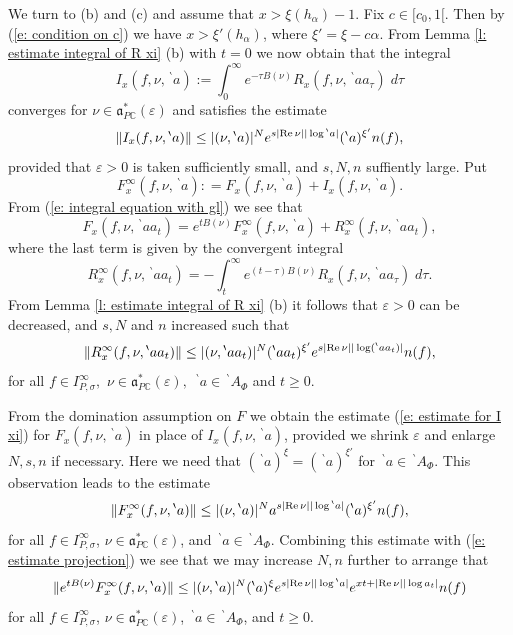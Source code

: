 \documentclass[12pt,a4paper]{article}
\def\msy#1{{\mathbb #1}}
\def\C{{\msy C}}
\def\ga{\alpha}
\def\ge{\varepsilon}
\def\gs{\sigma}
\def\got#1{\mathfrak #1}
\def\fa{{\got a}}
\def\Re{{\rm Re}\,}
\def\iC{{\scriptscriptstyle \C}}
\numberwithin{Thm}{section}
\numberwithin{equation}{section}
\def\faPdc{{\fa_{P\iC}^*}}
\numberwithin{equation}{section}
\def\bp{\!{\,}^\backprime}
\def\faPdc{\fa_{P\iC}^*}
\def\snorm{n}
\def\IPgs{I_{P,\gs}^\infty}
\def\xx{x}
\def\xxi{\xi}
\begin{document}
We turn to (b) and (c) and assume that $\xx > \xxi(h_\ga) -1.$ 
Fix $c\in [c_0, 1[$.
Then by (\ref{e: condition on c}) we have 
$\xx > \xxi'(h_\ga)$, where $\xxi' = \xxi - c\ga.$ 
From Lemma \ref{l: estimate integral of R xi} (b) with $t =0$ we now obtain that 
the integral
$$ 
I_\xx(f, \nu, \bp a) := \int_0^\infty  e^{-\tau B(\nu)} R_\xx(f,\nu, \bp aa_\tau) \; d\tau
$$ 
converges for $\nu \in \faPdc(\ge)$ and satisfies the estimate
\begin{equation}
\label{e: estimate for I xi}
\| I_\xx(f, \nu, \bp a)\| \leq |(\nu, \bp a)|^N  e^{s|\Re \nu| |\log \bp a|} (\bp a)^{\xxi'} \snorm(f),
\end{equation}
provided that $\ge>0$ is taken sufficiently small, and $s, N, n$ suffiently large.
Put 
\begin{equation}
\label{e: defi F infty}
F^\infty_\xx(f,\nu, \bp a): =  F_\xx(f, \nu, \bp a) + I_\xx(f,\nu, \bp a).
\end{equation}
From (\ref{e: integral equation with gl}) we see that 
\begin{equation}
\label{e: expression F xi with int J}
F_\xx(f, \nu, \bp a a_t) = e^{t B(\nu)} F^\infty_\xx(f, \nu, \bp a)  + R^\infty_\xx(f,\nu, \bp aa_t),
\end{equation}
where the last term is  given by the convergent integral
\begin{equation}
\label{e: defi R infty 2}
R_\xx^\infty(f, \nu, \bp aa_t) = - \int_t^\infty e^{(t -\tau)B(\nu)} R_\xx(f, \nu, \bp aa_\tau)\; d\tau.
\end{equation} 
From Lemma \ref{l: estimate integral of R xi} (b) it follows that
$\ge>0$ can be decreased, and $s, N$ and $n$ increased such that
\begin{equation}
\label{e: estimate R infty} 
\| R_\xx^\infty(f, \nu, \bp aa_t)\| \leq 
|(\nu, \bp aa_t)|^{N} (\bp aa_t)^{\xxi'}  e^{s|\Re \nu||\log (\bp a a_t) | }\snorm(f),
\end{equation}
for all $f \in \IPgs,$ $\nu \in \faPdc(\ge),$ $\bp\! a\in \bp\!A_\Phi$ and $t \geq 0.$ 

From the domination assumption on $F$ we obtain the estimate 
(\ref{e: estimate for I xi}) for $F_\xx(f, \nu, \bp \!a)$ in place of $I_\xx(f, \nu, \bp\!a)$, provided 
we shrink $\ge$ and enlarge $N,s, \snorm$ if necessary. Here we need that
$(\bp a)^{\xxi} = (\bp a)^{\xxi'}$ for  $\bp a \in \bp A_\Phi.$ This observation leads to the estimate
$$
\|F^\infty_\xx(f, \nu, \bp a)\| \leq |(\nu, \bp a)|^N a^{s|\Re \nu||\log \bp a|} 
(\bp a)^{\xxi'} \snorm(f),
$$ 
for all $f \in \IPgs $, $\nu \in \faPdc(\ge)$, and $\bp a \in \bp A_\Phi$. 
Combining this estimate with (\ref{e: estimate projection}) we see that we may increase $N, \snorm$ further to arrange that
\begin{equation}
\label{e: estimate F xi infty}
\|e^{tB(\nu)} F^\infty_\xx (f, \nu, \bp a) \|  \leq  
|(\nu, \bp a)|^N(\bp a)^\xxi e^{s|\Re\nu||\log \bp a|}e^{\xx t + |\Re \nu||\log a_t|}
\snorm(f)
\end{equation}
for all $f \in \IPgs$,  $\nu \in \faPdc(\ge)$,   $\bp a \in \bp A_\Phi$, and  $t \geq 0$. 
\end{document}

